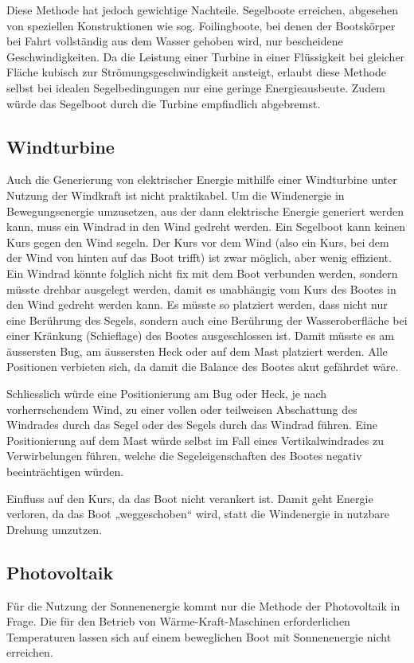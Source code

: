Diese Methode hat jedoch gewichtige Nachteile. Segelboote erreichen, abgesehen von speziellen Konstruktionen wie sog. Foilingboote, bei denen der Bootskörper bei Fahrt vollständig aus dem Wasser gehoben wird, nur bescheidene Geschwindigkeiten. Da die Leistung einer Turbine in einer Flüssigkeit bei gleicher Fläche kubisch zur Strömungsgeschwindigkeit ansteigt, erlaubt diese Methode selbst bei idealen Segelbedingungen nur eine geringe Energieausbeute. Zudem würde das Segelboot durch die Turbine empfindlich abgebremst. 

\subsection{Windturbine}
Auch die Generierung von elektrischer Energie mithilfe einer Windturbine unter Nutzung der Windkraft ist nicht praktikabel. Um die Windenergie in Bewegungsenergie umzusetzen, aus der dann elektrische Energie generiert werden kann, muss ein Windrad in den Wind gedreht werden. Ein Segelboot kann keinen Kurs gegen den Wind segeln. Der Kurs vor dem Wind (also ein Kurs, bei dem der Wind von hinten auf das Boot trifft) ist zwar möglich, aber wenig effizient. Ein Windrad könnte folglich nicht fix mit dem Boot verbunden werden, sondern müsste drehbar ausgelegt werden, damit es unabhängig vom Kurs des Bootes in den Wind gedreht werden kann. Es müsste so platziert werden, dass nicht nur eine Berührung des Segels, sondern auch eine Berührung der Wasseroberfläche bei einer Kränkung (Schieflage) des Bootes ausgeschlossen ist. Damit müsste es am äussersten Bug, am äussersten Heck oder auf dem Mast platziert werden. Alle Positionen verbieten sich, da damit die Balance des Bootes akut gefährdet wäre. 

Schliesslich würde eine Positionierung am Bug oder Heck, je nach vorherrschendem Wind, zu einer vollen oder teilweisen Abschattung des Windrades durch das Segel oder des Segels durch das Windrad führen. Eine Positionierung auf dem Mast würde selbst im Fall eines Vertikalwindrades zu Verwirbelungen führen, welche die Segeleigenschaften des Bootes negativ beeinträchtigen würden. 

Einfluss auf den Kurs, da das Boot nicht verankert ist. Damit geht Energie verloren, da das Boot „weggeschoben“ wird, statt die Windenergie in nutzbare Drehung umzutzen.

\subsection{Photovoltaik}
Für die Nutzung der Sonnenenergie kommt nur die Methode der Photovoltaik in Frage. Die für den Betrieb von Wärme-Kraft-Maschinen erforderlichen Temperaturen lassen sich auf einem beweglichen Boot mit Sonnenenergie nicht erreichen.

